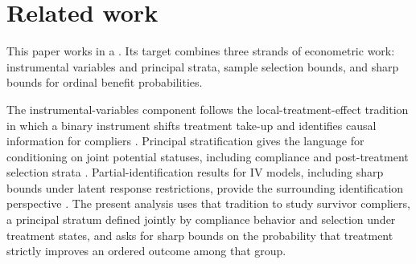\section{Related work}\label{sec:related-literature}

This paper works in a . Its target combines three strands of econometric work: instrumental variables and principal strata, sample selection bounds, and sharp bounds for ordinal benefit probabilities.

The instrumental-variables component follows the local-treatment-effect tradition in which a binary instrument shifts treatment take-up and identifies causal information for compliers \citep{ImbensAngrist1994,AngristImbensRubin1996}. Principal stratification gives the language for conditioning on joint potential statuses, including compliance and post-treatment selection strata \citep{FrangakisRubin2002}. Partial-identification results for IV models, including sharp bounds under latent response restrictions, provide the surrounding identification perspective \citep{BalkePearl1997,Manski1990,Manski1997,ManskiPepper2000,Manski2003}. The present analysis uses that tradition to study survivor compliers, a principal stratum defined jointly by compliance behavior and selection under treatment states, and asks for sharp bounds on the probability that treatment strictly improves an ordered outcome among that group.

